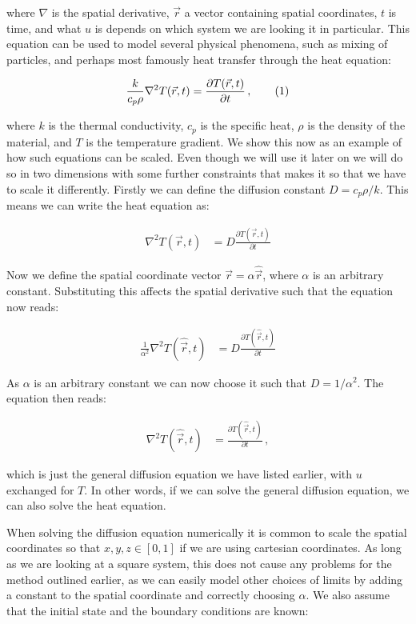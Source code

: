 \documentclass[reprint,english,notitlepage]{revtex4-1}  %
\newcommand\numberthis{\addtocounter{equation}{1}\tag{\theequation}}
\begin{document}
where $\nabla$ is the spatial derivative, $\vec{r}$ a vector containing spatial coordinates, $t$ is time, and what $u$ is depends on which system we are looking it in particular. This equation can be used to model several physical phenomena, such as mixing of particles, and perhaps most famously heat transfer through the heat equation:

\begin{align*}
\frac{k}{c_p \rho} \nabla^2 T(\vec{r},t) = \frac{\partial T (\vec{r},t)}{\partial t} \, , \numberthis \label{eq:heat_equation_general}
\end{align*}

where $k$ is the thermal conductivity, $c_p$ is the specific heat, $\rho$ is the density of the material, and $T$ is the temperature gradient. We show this now as an example of how such equations can be scaled. Even though we will use it later on we will do so in two dimensions with some further constraints that makes it so that we have to scale it differently. Firstly we can define the diffusion constant $D = c_p \rho / k$. This means we can write the heat equation as:

\begin{align*}
\nabla^2 T(\vec{r},t) &= D \frac{\partial T(\vec{r},t)}{\partial t}
\end{align*}

Now we define the spatial coordinate vector $\vec{r} = \alpha \hat{\vec{r}}$, where $\alpha$ is an arbitrary constant. Substituting this affects the spatial derivative such that the equation now reads:

\begin{align*}
\frac{1}{\alpha^2} \nabla^2 T(\hat{\vec{r}},t) &= D \frac{\partial T(\hat{\vec{r}},t)}{\partial t}
\end{align*}  

As $\alpha$ is an arbitrary constant we can now choose it such that $D = 1/\alpha^2$. The equation then reads:

\begin{align*}
\nabla^2 T(\hat{\vec{r}},t) &= \frac{\partial T(\hat{\vec{r}},t)}{\partial t} \, ,
\end{align*}

which is just the general diffusion equation we have listed earlier, with $u$ exchanged for $T$. In other words, if we can solve the general diffusion equation, we can also solve the heat equation.

When solving the diffusion equation numerically it is common to scale the spatial coordinates so that $x,y,z \in [0,1]$ if we are using cartesian coordinates. As long as we are looking at a square system, this does not cause any problems for the method outlined earlier, as we can easily model other choices of limits by adding a constant to the spatial coordinate and correctly choosing $\alpha$. We also assume that the initial state and the boundary conditions are known: 
\end{document}
